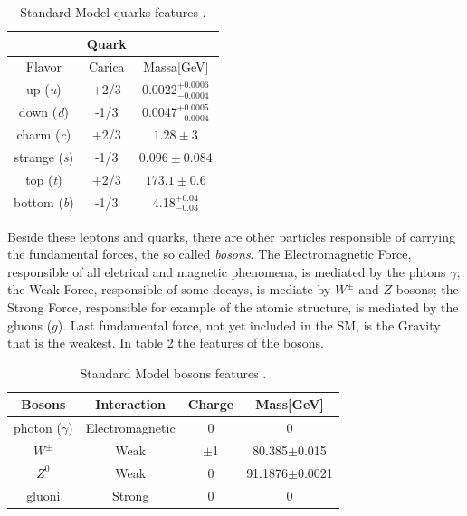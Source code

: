 \begin{table}[htbp]	
	\begin{center}
		\begin{tabular}{|ccc|}
			\hline    & \textbf{Quark} &   \\
			\hline   Flavor & Carica & Massa[GeV]  \\
			\hline
			\hline
			up (\emph{u}) & +2/3 & 0.0022$^{+0.0006}_{-0.0004}$ \\   
			down (\emph{d}) & -1/3 & 0.0047$^{+0.0005}_{-0.0004}$ \\
			\hline
			charm (\emph{c}) & +2/3 & $1.28\pm3$ \\
			strange (\emph{s}) & -1/3 & $0.096\pm0.084$ \\
			\hline
			top (\emph{t}) & +2/3 & $173.1\pm0.6$ \\
			bottom (\emph{b}) & -1/3 & 4.18$^{+0.04}_{-0.03}$ \\   
			\hline
			\hline
		\end{tabular}
	\end{center}
	\caption{Standard Model quarks features \cite{PDG}.}
	\label{quarkSM}
\end{table}

Beside these leptons and quarks, there are other particles responsible of carrying the fundamental forces, the so called \textit{bosons}. The Electromagnetic Force, responsible of all eletrical and magnetic phenomena, is mediated by the phtons {$\gamma$}; the Weak Force, responsible of some decays, is mediate by $W^{\pm}$ and $Z$ bosons; the Strong Force, responsible for example of the atomic structure, is mediated by the gluons ($g$). Last fundamental force, not yet included in the SM, is the Gravity that is the weakest. In table \ref{bosonsSM} the features of the bosons.
\begin{table}[htbp]	
	\begin{center}
		\begin{tabular}{|cccc|}
			\hline    Bosons & Interaction & Charge & Mass[GeV]  \\
			\hline
			\hline
			 photon ($\gamma$) &  Electromagnetic & 0 & 0   \\
			 \hline
			 $W^{\pm}$ & Weak & $\pm$1 & 80.385$\pm$0.015   \\
			 \hline 
             	 	 $Z^{0}$ & Weak & 0 & 91.1876$\pm$0.0021   \\
			 \hline
			 gluoni & Strong & 0 & 0 \\
			\hline
			\hline
		\end{tabular}
	\end{center}
	\caption{Standard Model bosons features \cite{PDG}.}
	\label{bosonsSM}
\end{table}


